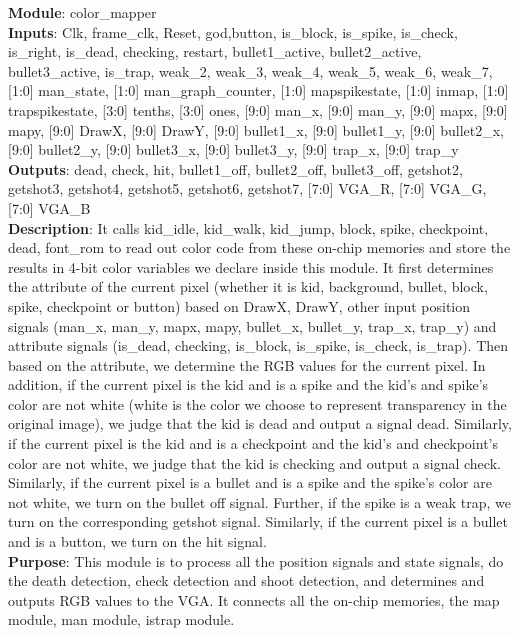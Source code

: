 \documentclass[12pt]{article}
\begin{document}
\textbf{Module}: color\_mapper \\ 
\textbf{Inputs}: Clk, frame\_clk, Reset, god,button, is\_block, is\_spike, is\_check, is\_right, is\_dead, checking, restart, bullet1\_active, bullet2\_active, bullet3\_active, is\_trap, weak\_2, weak\_3, weak\_4, weak\_5, weak\_6, weak\_7, [1:0] man\_state, [1:0] man\_graph\_counter, [1:0] mapspikestate, [1:0] inmap, [1:0] trapspikestate, [3:0] tenths, [3:0] ones, [9:0] man\_x, [9:0] man\_y, [9:0] mapx, [9:0] mapy, [9:0] DrawX, [9:0] DrawY, [9:0] bullet1\_x, [9:0] bullet1\_y, [9:0] bullet2\_x, [9:0] bullet2\_y, [9:0] bullet3\_x, [9:0] bullet3\_y, [9:0] trap\_x, [9:0] trap\_y \\ 
\textbf{Outputs}: dead, check, hit, bullet1\_off, bullet2\_off, bullet3\_off, getshot2, getshot3, getshot4, getshot5, getshot6, getshot7, [7:0] VGA\_R, [7:0] VGA\_G, [7:0] VGA\_B \\
\textbf{Description}: It calls kid\_idle, kid\_walk, kid\_jump, block, spike, checkpoint, dead, font\_rom to read out color code from these on-chip memories and store the results in 4-bit color variables we declare inside this module. It first determines the attribute of the current pixel (whether it is kid, background, bullet, block, spike, checkpoint or button) based on DrawX, DrawY, other input position signals (man\_x, man\_y, mapx, mapy, bullet\_x, bullet\_y, trap\_x, trap\_y) and attribute signals (is\_dead, checking, is\_block, is\_spike, is\_check, is\_trap). Then based on the attribute, we determine the RGB values for the current pixel. In addition, if the current pixel is the kid and is a spike and the kid's and spike's color are not white (white is the color we choose to represent transparency in the original image), we judge that the kid is dead and output a signal dead. Similarly, if the current pixel is the kid and is a checkpoint and the kid's and checkpoint's color are not white, we judge that the kid is checking and output a signal check. Similarly, if the current pixel is a bullet and is a spike and the spike's color are not white, we turn on the bullet off signal. Further, if the spike is a weak trap, we turn on the corresponding getshot signal. Similarly, if the current pixel is a bullet and is a button, we turn on the hit signal. \\
\textbf{Purpose}: This module is to process all the position signals and state signals, do the death detection, check detection and shoot detection, and determines and outputs RGB values to the VGA. It connects all the on-chip memories, the map module, man module, istrap module. \\
\end{document}
